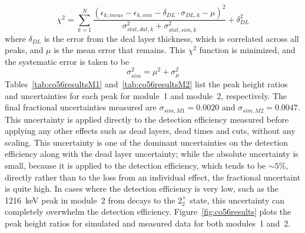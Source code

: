 \documentclass[notitlepage,rmp,aps,10pt]{revtex4-1}
\newcommand{\iso}[2]{$^{#1}$#2}
\newcommand{\Co}[1]{\iso{#1}{Co}}
\newcommand{\SP}[3]{$#1^{#2}_{#3}$}
\begin{document}
\begin{equation}
  \chi^2 = \displaystyle\sum_{k=1}^N \frac{(\epsilon_{k, meas}-\epsilon_{k, sim}-\delta_{DL}\cdot\sigma_{DL,k} - \mu)^2}{\sigma_{stat,dat,k}^2+\sigma_{stat,sim,k}^2} + \delta_{DL}^2
\end{equation}
where $\delta_{DL}$ is the error from the deal layer thickness, which is correlated across all peaks, and $\mu$ is the mean error that remains.
This $\chi^2$ function is minimized, and the systematic error is taken to be
\begin{equation}
  \sigma_{sim}^2 = \mu^2 + \sigma_\mu^2
\end{equation}
Tables~\ref{tab:co56resultsM1} and~\ref{tab:co56resultsM2} list the peak height ratios and uncertainties for each peak for module~1 and module~2, respectively.
The final fractional uncertainties measured are $\sigma_{sim,M1}=0.0020$ and $\sigma_{sim,M2}=0.0047$.
This uncertainty is applied directly to the detection efficiency measured before applying any other effects such as dead layers, dead times and cuts, without any scaling.
This uncertainty is one of the dominant uncertainties on the detection efficiency along with the dead layer uncertainty; while the absolute uncertainty is small, because it is applied to the detection efficiency, which tends to be $\sim5$\%, directly rather than to the loss from an individual effect, the fractional uncertaint is quite high.
In cases where the detection efficiency is very low, such as the 1216~keV peak in module~2 from decays to the \SP{2}{+}{2} state, this uncertainty can completely overwhelm the detection efficiency.
Figure~\ref{fig:co56results} plots the peak height ratios for simulated and measured data for both modules~1 and~2.

\begin{table}[h]
  \caption[Table of peak height ratios for module~1]{\label{tab:co56resultsM1}
    Table of measured peak height ratios between multiplicity~1 events and multiplicity~2 events containing a 511~keV annihalation $\gamma$ in module~1 for both simulated and measured \Co{56} spectra, with uncertainties. A plot of these numbers is shown in figure~\ref{fig:co56results}
  }
  
\end{table}

\begin{table}[h]
  \caption[Table of peak height ratios for module~2]{\label{tab:co56resultsM2}
    Table of measured peak height ratios between multiplicity~1 events and multiplicity~2 events containing a 511~keV annihalation $\gamma$ in module~2 for both simulated and measured \Co{56} spectra, with uncertainties. A plot of these numbers is shown in figure~\ref{fig:co56results}
  }
  
\end{table}
\end{document}
